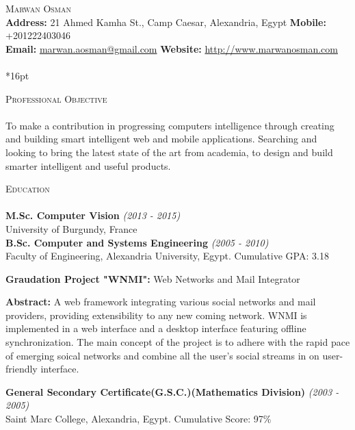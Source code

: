 \documentclass[letterpaper,12pt]{article}
\author{Marwan Osman}
\newcommand{\lineunder}{\vspace*{-8pt} \\ \hspace*{-8pt} \hrulefill \\}
\newcommand{\interval}[1]{\textit{(#1)} }
\newcommand{\header}[1]{{\hspace*{0pt}\vspace*{6pt} \textsc{#1}} \vspace*{-6pt} \lineunder}
\newcommand{\education}[3]{{\textbf{#1} \interval{#2}\\{#3}\\ }}
\newcommand{\objective}[1]{{#1\\\vspace*{8pt}}}
\newcommand{\contact}[3]{
\vspace*{-8pt}
{\LARGE \scshape {#1}}\\
#2 \lineunder 
#3
\vspace*{-8pt}
}
\newenvironment{details}{\vspace*{-4pt} \begin{list}{\topsep 0pt \itemsep -2pt}}{\vspace*{4pt}\end{list}}
\begin{document}
\small
\smallskip
\vspace*{-30pt}

\contact{Marwan Osman}
{\textbf{Address:} 21 Ahmed Kamha St., Camp Caesar, Alexandria, Egypt \textbf{Mobile:} +201222403046
\\\textbf{Email:} \href{mailto:marwan.aosman@gmail.com}{marwan.aosman@gmail.com} \textbf{Website:} \url{http://www.marwanosman.com}
}

\vspace*{16pt}

\header{Professional Objective}
\objective{To make a contribution in progressing computers intelligence through creating and building smart intelligent web and mobile applications.
Searching and looking to bring the latest state of the art from academia, to design and build smarter intelligent and useful products.}

\header{Education}
\education{M.Sc. Computer Vision}{2013 - 2015}{University of Burgundy, France}
\vspace*{4pt}
\education{B.Sc. Computer and Systems Engineering}{2005 - 2010}{Faculty of Engineering, Alexandria University, Egypt. Cumulative GPA: 3.18}
  \begin{details}
    \item \textbf{Graudation Project "WNMI":} Web Networks and Mail Integrator
    \item \textbf{Abstract:} A web framework integrating various social networks and mail providers, providing extensibility to any new coming network. WNMI is implemented in a web interface and a desktop interface featuring offline synchronization. The main concept of the project is to adhere with the rapid pace of emerging soical networks and combine all the user's social streams in on user-friendly interface.
  \end{details}
\vspace*{4pt}
\education{General Secondary Certificate(G.S.C.)(Mathematics Division)}{2003 - 2005}{Saint Marc College, Alexandria, Egypt. Cumulative Score: 97\%}
\vspace*{4pt}
\end{document}
